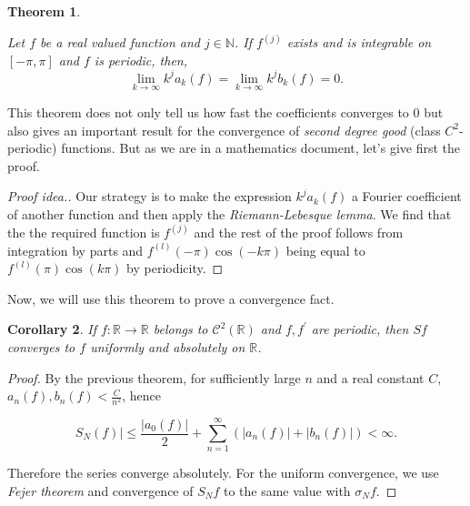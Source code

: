 \documentclass[12pt]{amsart}
\newtheorem{theorem}{Theorem}[section]
\newtheorem{corollary}[theorem]{Corollary}
\theoremstyle{definition}
\newcommand{\RR}{{\mathbb R}} %
\newcommand{\cC}{{\mathcal C}}
\begin{document}
\begin{theorem}\label{growth of coefficients in C^j}

    Let $f$ be a real valued function and $j \in \mathbb{N}$. If $f^{(j)}$ exists and is integrable on $[-\pi,\pi]$ and $f$ is periodic, then,
    \begin{equation}
        \lim_{k \to \infty} k^j a_k(f) = \lim_{k \to \infty} k^j b_k(f) = 0.
    \end{equation}
\end{theorem}


This theorem does not only tell us how fast the coefficients converges to 0 but also gives an important result for the convergence of \textit{second degree good} (class $C^2$-periodic) functions. But as we are in a mathematics document, let's give first the proof.


\begin{proof}[Proof idea.]
    Our strategy is to make the expression $k^ja_k(f)$ a Fourier coefficient of another function and then apply the \emph{Riemann-Lebesque lemma}. We find that the the required function is $f^{(j)}$ and the rest of the proof follows from integration by parts and $f^{(l)}(-\pi)\cos(-k\pi)$ being equal to $f^{(l)}(\pi)\cos(k\pi)$ by periodicity.
\end{proof}


Now, we will use this theorem to prove a convergence fact.


\begin{corollary}\label{C^2 converges}
    If $f: \RR \to \RR$ belongs to $\cC^2(\RR) $ and $f, f^{'}$\footnotemark{} are periodic, then $Sf$ converges to $f$ uniformly and absolutely on $\RR$.
\end{corollary}





\begin{proof}
    By the previous theorem, for sufficiently large $n$ and a real constant $C$, $a_n(f), b_n(f) < \frac{C}{n^2}$, hence

    
    \[
    S_N(f) |\leq  \frac{|a_0(f)|}{2} + \sum_{n=1}^{\infty} \left(|a_n(f)| + |b_n(f)|\right) < \infty.
    \]
    
    Therefore the series converge absolutely. For the uniform convergence, we use \textit{Fejer theorem} and convergence of $S_Nf$ to the same value with $\sigma_N f$.
\end{proof}
\end{document}
